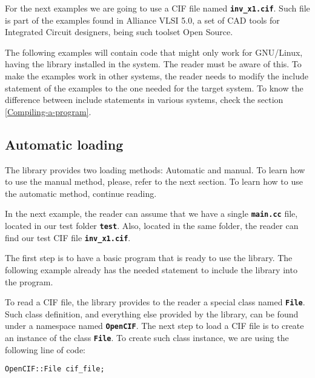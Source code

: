 \documentclass[11pt,twoside,openany,x11names,svgnames]{memoir}
\begin{document}
For the next examples we are going to use a CIF file named \textbf{\texttt{inv\_x1.cif}}. Such file is part of the examples found in Alliance VLSI 5.0, a set of CAD tools for Integrated Circuit designers, being such toolset Open Source.

The following examples will contain code that might only work for GNU/Linux, having the library installed in the system. The reader must be aware of this. To make the examples work in other systems, the reader needs to modify the include statement of the examples to the one needed for the target system. To know the difference between include statements in various systems, check the section \ref{Compiling-a-program}.

\subsection{Automatic loading}\label{Automatic-loading}

The library provides two loading methods: Automatic and manual. To learn how to use the manual method, please, refer to the next section. To learn how to use the automatic method, continue reading.

In the next example, the reader can assume that we have a single \textbf{\texttt{main.cc}} file, located in our test folder \textbf{\texttt{test}}. Also, located in the same folder, the reader can find our test CIF file \textbf{\texttt{inv\_x1.cif}}.

The first step is to have a basic program that is ready to use the library. The following example already has the needed statement to include the library into the program.



To read a CIF file, the library provides to the reader a special class named \textbf{\texttt{File}}. Such class definition, and everything else provided by the library, can be found under a namespace named \textbf{\texttt{OpenCIF}}. The next step to load a CIF file is to create an instance of the class \textbf{\texttt{File}}. To create such class instance, we are using the following line of code:

\begin{lstlisting}[frame=single,style=CPPStyle]
OpenCIF::File cif_file;
\end{lstlisting}
\end{document}
